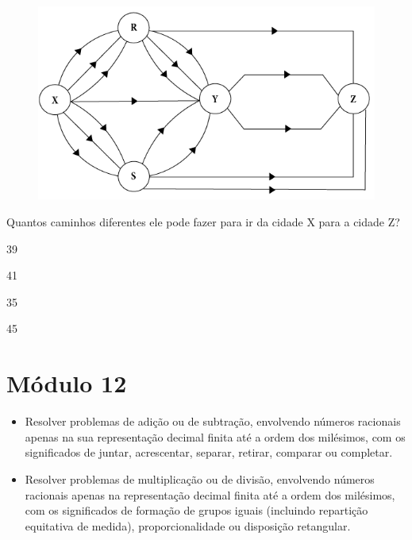 \begin{figure}[htpb!]
\centering
\includegraphics[width=\textwidth]{../ilustracoes/MAT5/SAEB_5ANO_MAT_figura84.png}
\end{figure}

Quantos caminhos diferentes ele pode fazer para ir da cidade X para a
cidade Z?

\begin{minipage}{.5\textwidth}
\begin{escolha}
\item
  39
\item
  41
\item
  35
\item
  45
\end{escolha}
\end{minipage}

\chapter{Módulo 12}



\begin{itemize}
\item Resolver problemas de adição ou de subtração, envolvendo números
racionais apenas na sua representação decimal finita até a ordem dos
milésimos, com os significados de juntar, acrescentar, separar, retirar,
comparar ou completar.

\item Resolver problemas de multiplicação ou de divisão, envolvendo números
racionais apenas na representação decimal finita até a ordem dos
milésimos, com os significados de formação de grupos iguais (incluindo
repartição equitativa de medida), proporcionalidade ou disposição
retangular.
\end{itemize}

